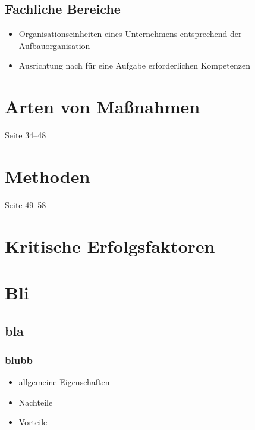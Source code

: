 \documentclass[a4paper, 12pt]{article}
\begin{document}
\subsection{Fachliche Bereiche}
\begin{itemize}
  \item Organisationseinheiten eines Unternehmens entsprechend der Aufbauorganisation
  \item Ausrichtung nach für eine Aufgabe erforderlichen Kompetenzen
\end{itemize}


\section{Arten von Maßnahmen}
Seite 34--48



\section{Methoden}
Seite 49--58



\section{Kritische Erfolgsfaktoren}






\section{Bli}


\subsection{bla}

\subsubsection*{blubb}

\begin{itemize}
  \item allgemeine Eigenschaften
\end{itemize}
\begin{itemize}
  \renewcommand{\labelitemi}{\(-\)}%
  \item Nachteile
\end{itemize}
\begin{itemize}
  \renewcommand{\labelitemi}{+}%
  \item Vorteile
\end{itemize}
\end{document}
